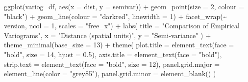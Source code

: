 \documentclass[
  11pt,
]{article}
\newenvironment{Shaded}{\begin{snugshade}}{\end{snugshade}}
\newcommand{\AttributeTok}[1]{\textcolor[rgb]{0.40,0.45,0.13}{#1}}
\newcommand{\DecValTok}[1]{\textcolor[rgb]{0.68,0.00,0.00}{#1}}
\newcommand{\FloatTok}[1]{\textcolor[rgb]{0.68,0.00,0.00}{#1}}
\newcommand{\FunctionTok}[1]{\textcolor[rgb]{0.28,0.35,0.67}{#1}}
\newcommand{\NormalTok}[1]{\textcolor[rgb]{0.00,0.23,0.31}{#1}}
\newcommand{\SpecialCharTok}[1]{\textcolor[rgb]{0.37,0.37,0.37}{#1}}
\newcommand{\StringTok}[1]{\textcolor[rgb]{0.13,0.47,0.30}{#1}}
\begin{document}
\begin{Shaded}
\begin{Highlighting}[]
\FunctionTok{ggplot}\NormalTok{(variog\_df, }\FunctionTok{aes}\NormalTok{(}\AttributeTok{x =}\NormalTok{ dist, }\AttributeTok{y =}\NormalTok{ semivar)) }\SpecialCharTok{+}
  \FunctionTok{geom\_point}\NormalTok{(}\AttributeTok{size =} \DecValTok{2}\NormalTok{, }\AttributeTok{colour =} \StringTok{"black"}\NormalTok{) }\SpecialCharTok{+}
  \FunctionTok{geom\_line}\NormalTok{(}\AttributeTok{colour =} \StringTok{"darkred"}\NormalTok{, }\AttributeTok{linewidth =} \DecValTok{1}\NormalTok{) }\SpecialCharTok{+}
  \FunctionTok{facet\_wrap}\NormalTok{(}\SpecialCharTok{\textasciitilde{}}\NormalTok{ version, }\AttributeTok{ncol =} \DecValTok{1}\NormalTok{, }\AttributeTok{scales =} \StringTok{"free\_x"}\NormalTok{) }\SpecialCharTok{+}
  \FunctionTok{labs}\NormalTok{(}
    \AttributeTok{title =} \StringTok{"Comparison of Empirical Variograms"}\NormalTok{,}
    \AttributeTok{x =} \StringTok{"Distance (spatial units)"}\NormalTok{,}
    \AttributeTok{y =} \StringTok{"Semi{-}variance"}
\NormalTok{  ) }\SpecialCharTok{+}
  \FunctionTok{theme\_minimal}\NormalTok{(}\AttributeTok{base\_size =} \DecValTok{13}\NormalTok{) }\SpecialCharTok{+}
  \FunctionTok{theme}\NormalTok{(}
    \AttributeTok{plot.title =} \FunctionTok{element\_text}\NormalTok{(}\AttributeTok{face =} \StringTok{"bold"}\NormalTok{, }\AttributeTok{size =} \DecValTok{14}\NormalTok{, }\AttributeTok{hjust =} \FloatTok{0.5}\NormalTok{),}
    \AttributeTok{axis.title =} \FunctionTok{element\_text}\NormalTok{(}\AttributeTok{face =} \StringTok{"bold"}\NormalTok{),}
    \AttributeTok{strip.text =} \FunctionTok{element\_text}\NormalTok{(}\AttributeTok{face =} \StringTok{"bold"}\NormalTok{, }\AttributeTok{size =} \DecValTok{12}\NormalTok{),}
    \AttributeTok{panel.grid.major =} \FunctionTok{element\_line}\NormalTok{(}\AttributeTok{color =} \StringTok{"grey85"}\NormalTok{),}
    \AttributeTok{panel.grid.minor =} \FunctionTok{element\_blank}\NormalTok{()}
\NormalTok{  )}
\end{Highlighting}
\end{Shaded}
\end{document}
